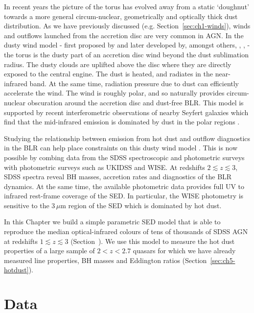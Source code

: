 In recent years the picture of the torus has evolved away from a static `doughnut' towards a more general circum-nuclear, geometrically and optically thick dust distribution. 
As we have previously discussed (e.g. Section~\ref{sec:ch1-winds}), winds and outflows launched from the accretion disc are very common in AGN. 
In the dusty wind model - first proposed by \citet{konigl94} and later developed by, amongst others, \citet{everett05}, \citet{elitzur06}, \citet{keating12} - the torus is the dusty part of an accretion disc wind beyond the dust sublimation radius.  
The dusty clouds are uplifted above the disc where they are directly exposed to the central engine. 
The dust is heated, and radiates in the near-infrared band.
At the same time, radiation pressure due to dust can efficiently accelerate the wind. 
The wind is roughly polar, and so naturally provides circum-nuclear obscuration around the accretion disc and dust-free BLR.   
This model is supported by recent interferometric observations of nearby Seyfert galaxies which find that the mid-infrared emission is dominated by dust in the polar regions \citep[e.g.][]{raban09,honig12,honig13,tristram14,lopez-gonzaga16}.

Studying the relationship between emission from hot dust and outflow diagnostics in the BLR can help place constraints on this dusty wind model \citep[e.g.][]{wang13}. 
This is now possible by combing data from the SDSS spectroscopic and photometric surveys with photometric surveys such as UKIDSS and WISE. 
At redshifts $2\lesssim z \lesssim3$, SDSS spectra reveal BH masses, accretion rates and diagnostics of the BLR dynamics. 
At the same time, the available photometric data provides full UV to infrared rest-frame coverage of the SED.
In particular, the WISE photometry is sensitive to the 3\,$\mu$m region of the SED which is dominated by hot dust. 

In this Chapter we build a simple parametric SED model that is able to reproduce the median optical-infrared colours of tens of thousands of SDSS AGN at redshifts $1 \lesssim z \lesssim 3$ (Section~\label{sec:ch5-standardmodel}).
We use this model to measure the hot dust properties of a large sample of $2 < z < 2.7$ quasars for which we have already measured  line properties, BH masses and Eddington ratios (Section~\ref{sec:ch5-hotdust}).

\section{Data}

